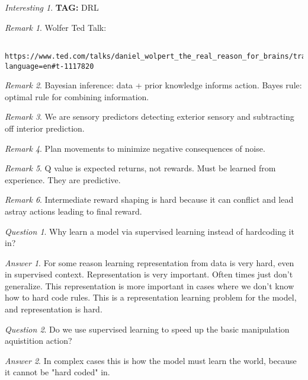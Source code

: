 \documentclass[11pt]{article}
\theoremstyle{remark}
\newtheorem{remark}{Remark}
\newtheorem{quest}{Question}
\newtheorem{ans}{Answer}
\newtheorem{interest}{Interesting}
\begin{document}
\begin{interest}
\textbf{TAG:} DRL

\begin{remark}
	Wolfer Ted Talk:
	\begin{verbatim}
		https://www.ted.com/talks/daniel_wolpert_the_real_reason_for_brains/transcript?language=en#t-1117820
	\end{verbatim}
\end{remark}

\begin{remark}
	Bayesian inference: data + prior knowledge informs action. Bayes rule: optimal rule for combining information.
\end{remark}

\begin{remark}
	We are sensory predictors detecting exterior sensory and subtracting off interior prediction.
\end{remark}

\begin{remark}
	Plan movements to minimize negative consequences of noise.
\end{remark}

\begin{remark}
	Q value is expected returns, not rewards. Must be learned from experience. They are predictive.
\end{remark}

\begin{remark}
	Intermediate reward shaping is hard because it can conflict and lead astray actions leading to final reward.
\end{remark}

\begin{quest}
	Why learn a model via supervised learning instead of hardcoding it in?
\end{quest}

\begin{ans}
	For some reason learning representation from data is very hard, even in supervised context. Representation is very important. Often times just don't generalize. This representation is more important in cases where we don't know how to hard code rules. This is a representation learning problem for the model, and representation is hard.
\end{ans}

\begin{quest}
	Do we use supervised learning to speed up the basic manipulation aquistition action?
\end{quest}

\begin{ans}
	In complex cases this is how the model must learn the world, because it cannot be "hard coded" in. 
\end{ans}


\end{interest}
\end{document}
